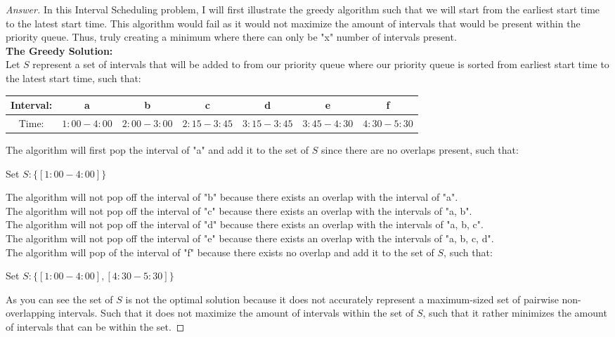 \documentclass[11pt]{article}
\theoremstyle{definition}
\theoremstyle{definition}
\theoremstyle{definition}
\begin{document}
\begin{proof}[Answer]
In this Interval Scheduling problem, I will first illustrate the greedy algorithm such that we will start from the earliest start time to the latest start time. This algorithm would fail as it would not maximize the amount of intervals that would be present within the priority queue. Thus, truly creating a minimum where there can only be "x" number of intervals present. \\

\textbf {The Greedy Solution:}\\
Let $S$ represent a set of intervals that will be added to from our priority queue where our priority queue is sorted from earliest start time to the latest start time, such that: \\
\begin{center}
\begin{tabular}{ | c | c | c | c | c | c | c | }
 \hline
 Interval:& a & b & c & d & e & f\\  
 \hline
 Time: & $1:00 - 4:00$ & $2:00 - 3:00$ & $2:15 - 3:45$ & $3:15 - 3:45$ & $3:45 - 4:30$ & $4:30 - 5:30$\\
  \hline
\end{tabular}
\end{center}
The algorithm will first pop the interval of "a" and add it to the set of $S$ since there are no overlaps present, such that: \\
\begin{center}
Set $S: \{[1:00 - 4: 00]\}$\\
\end{center}

The algorithm will not pop off the interval of "b" because there exists an overlap with the interval of "a". \\
The algorithm will not pop off the interval of "c" because there exists an overlap with the intervals of "a, b". \\
The algorithm will not pop off the interval of "d" because there exists an overlap with the intervals of "a, b, c". \\
The algorithm will not pop off the interval of "e" because there exists an overlap with the intervals of "a, b, c, d". \\

The algorithm will pop of the interval of "f" because there exists no overlap and add it to the set of $S$, such that: \\
\begin{center}
Set $S: \{[1:00 - 4: 00], [4:30 - 5:30]\}$\\
\end{center}
As you can see the set of $S$ is not the optimal solution because it does not accurately represent a maximum-sized set of pairwise non-overlapping intervals. Such that it does not maximize the amount of intervals within the set of $S$, such that it rather minimizes the amount of intervals that can be within the set. 
\end{proof}
\end{document}
